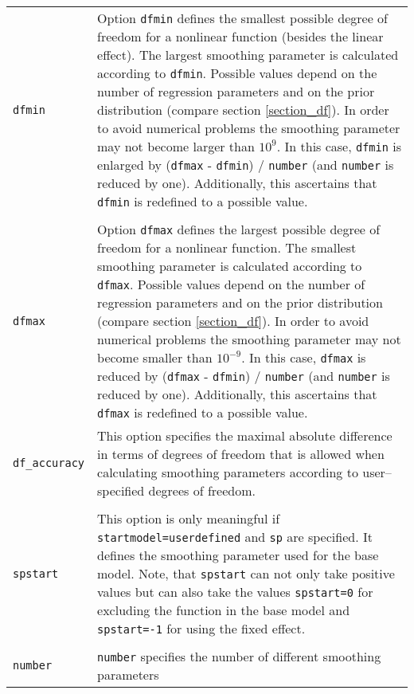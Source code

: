 \begin{longtable}{p{2.2cm} p{13.3cm}}
{\tt dfmin} & Option {\tt dfmin} defines the smallest possible degree of freedom
              for a nonlinear function (besides the linear effect).
              The largest smoothing parameter is calculated according to {\tt dfmin}.
              Possible values depend on the number of regression parameters
              and on the prior distribution
              (compare section \ref{section_df}). In order to avoid numerical problems
              the smoothing parameter may not become larger than $10^9$. In this
              case, {\tt dfmin} is enlarged by ({\tt dfmax} - {\tt dfmin}) / {\tt number}
              (and {\tt number} is reduced by one).
              Additionally, this ascertains that {\tt dfmin} is redefined to
              a possible value. \\
            & \\
{\tt dfmax} & Option {\tt dfmax} defines the largest possible degree of freedom for a
              nonlinear function. The smallest smoothing parameter is calculated
              according to {\tt dfmax}. Possible values depend on the number of regression
              parameters and on the prior distribution
              (compare section \ref{section_df}). In order to avoid numerical problems
              the smoothing parameter may not become smaller than $10^{-9}$. In this
              case, {\tt dfmax} is reduced by ({\tt dfmax} - {\tt dfmin}) / {\tt number}
              (and {\tt number} is reduced by one).
              Additionally, this ascertains that {\tt dfmax} is redefined to
              a possible value. \\
{\tt df\_accuracy} & This option specifies the maximal absolute difference in terms of
                     degrees of freedom that is allowed when calculating smoothing parameters
                     according to user--specified degrees of freedom. \\
            & \\
{\tt spstart} & This option is only meaningful if {\tt startmodel=userdefined} and {\tt sp}
                are specified. It defines the smoothing parameter used for the base model. Note, that {\tt spstart}
                can not only take positive values but can also take the values {\tt spstart=0} for
                excluding the function in the base model and {\tt spstart=-1} for using the fixed effect. \\
            & \\
{\tt number} & {\tt number} specifies the number of different smoothing parameters

\end{longtable}
